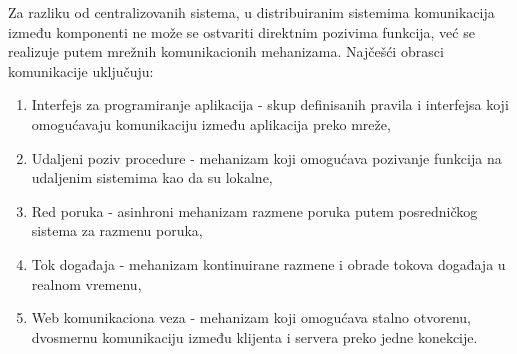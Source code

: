 Za razliku od centralizovanih sistema, u distribuiranim sistemima komunikacija između komponenti ne može se ostvariti direktnim pozivima funkcija, već se realizuje putem mrežnih komunikacionih mehanizama. Najčešći obrasci komunikacije uključuju:
\begin{enumerate}
\item Interfejs za programiranje aplikacija \cite{bloch2006design}  - skup definisanih pravila i interfejsa koji omogućavaju komunikaciju između aplikacija preko mreže,
\item Udaljeni poziv procedure \cite{birrell1984implementing}  - mehanizam koji omogućava pozivanje funkcija na udaljenim sistemima kao da su lokalne,
\item Red poruka \cite{eugster2003many}  - asinhroni mehanizam razmene poruka putem posredničkog sistema za razmenu poruka,
\item Tok događaja \cite{eugster2003many}  - mehanizam kontinuirane razmene i obrade tokova događaja u realnom vremenu,
\item Web komunikaciona veza \cite{fette2011websocket}  - mehanizam koji omogućava stalno otvorenu, dvosmernu komunikaciju između klijenta i servera preko jedne konekcije.
\end{enumerate}

